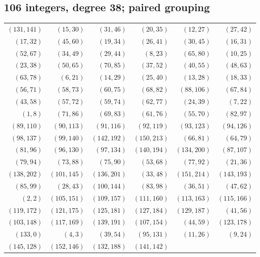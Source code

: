 \subsection*{106 integers, degree 38; paired grouping}
\begingroup\small
\begin{longtable}{rrrrrr}
$(131,141)$ & $(15,30)$ & $(31,46)$ & $(20,35)$ & $(12,27)$ & $(27,42)$\\
$(17,32)$ & $(45,60)$ & $(19,34)$ & $(26,41)$ & $(30,45)$ & $(16,31)$\\
$(52,67)$ & $(34,49)$ & $(29,44)$ & $(8,23)$ & $(65,80)$ & $(10,25)$\\
$(23,38)$ & $(50,65)$ & $(70,85)$ & $(37,52)$ & $(40,55)$ & $(48,63)$\\
$(63,78)$ & $(6,21)$ & $(14,29)$ & $(25,40)$ & $(13,28)$ & $(18,33)$\\
$(56,71)$ & $(58,73)$ & $(60,75)$ & $(68,82)$ & $(88,106)$ & $(67,84)$\\
$(43,58)$ & $(57,72)$ & $(59,74)$ & $(62,77)$ & $(24,39)$ & $(7,22)$\\
$(1,8)$ & $(71,86)$ & $(69,83)$ & $(61,76)$ & $(55,70)$ & $(82,97)$\\
$(89,110)$ & $(90,113)$ & $(91,116)$ & $(92,119)$ & $(93,123)$ & $(94,126)$\\
$(98,137)$ & $(99,140)$ & $(142,192)$ & $(150,213)$ & $(66,81)$ & $(64,79)$\\
$(81,96)$ & $(96,130)$ & $(97,134)$ & $(140,194)$ & $(134,200)$ & $(87,107)$\\
$(79,94)$ & $(73,88)$ & $(75,90)$ & $(53,68)$ & $(77,92)$ & $(21,36)$\\
$(138,202)$ & $(101,145)$ & $(136,201)$ & $(33,48)$ & $(151,214)$ & $(143,193)$\\
$(85,99)$ & $(28,43)$ & $(100,144)$ & $(83,98)$ & $(36,51)$ & $(47,62)$\\
$(2,2)$ & $(105,151)$ & $(109,157)$ & $(111,160)$ & $(113,163)$ & $(115,166)$\\
$(119,172)$ & $(121,175)$ & $(125,181)$ & $(127,184)$ & $(129,187)$ & $(41,56)$\\
$(103,148)$ & $(117,169)$ & $(139,191)$ & $(107,154)$ & $(44,59)$ & $(123,178)$\\
$(133,0)$ & $(4,3)$ & $(39,54)$ & $(95,131)$ & $(11,26)$ & $(9,24)$\\
$(145,128)$ & $(152,146)$ & $(132,188)$ & $(141,142)$ & &\\
\end{longtable}
\endgroup
